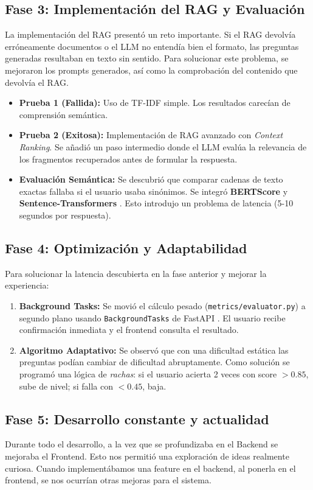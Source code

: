 \documentclass[12pt, a4paper]{article}
\begin{document}
\subsection{Fase 3: Implementación del RAG y Evaluación}
La implementación del RAG \cite{rags} presentó un reto importante. Si el RAG devolvía erróneamente documentos o el LLM no entendía bien el formato, las preguntas generadas resultaban en texto sin sentido. Para solucionar este problema, se mejoraron los prompts generados, así como la comprobación del contenido que devolvía el RAG.
\begin{itemize}
    \item \textbf{Prueba 1 (Fallida):} Uso de TF-IDF simple. Los resultados carecían de comprensión semántica.
    \item \textbf{Prueba 2 (Exitosa):} Implementación de RAG avanzado con \textit{Context Ranking}. Se añadió un paso intermedio donde el LLM evalúa la relevancia de los fragmentos recuperados antes de formular la respuesta.
    \item \textbf{Evaluación Semántica:} Se descubrió que comparar cadenas de texto exactas fallaba si el usuario usaba sinónimos. Se integró \textbf{BERTScore} \cite{bertscore} y \textbf{Sentence-Transformers} \cite{reimers2019sentencetransformers}. Esto introdujo un problema de latencia (5-10 segundos por respuesta).
\end{itemize}

\subsection{Fase 4: Optimización y Adaptabilidad}
Para solucionar la latencia descubierta en la fase anterior y mejorar la experiencia:
\begin{enumerate}
    \item \textbf{Background Tasks:} Se movió el cálculo pesado (\texttt{metrics/evaluator.py}) a segundo plano usando \texttt{BackgroundTasks} de FastAPI \cite{ramirez2018fastapi}. El usuario recibe confirmación inmediata y el frontend consulta el resultado.
    \item \textbf{Algoritmo Adaptativo:} Se observó que con una dificultad estática las preguntas podían cambiar de dificultad abruptamente. Como solución se programó una lógica de \textit{rachas}: si el usuario acierta 2 veces con score \(>0.85\), sube de nivel; si falla con \(<0.45\), baja.
\end{enumerate}

\subsection{Fase 5: Desarrollo constante y actualidad}
Durante todo el desarrollo, a la vez que se profundizaba en el Backend se mejoraba el Frontend. Esto nos permitió una exploración de ideas realmente curiosa. Cuando implementábamos una feature en el backend, al ponerla en el frontend, se nos ocurrían otras mejoras para el sistema.
\end{document}
